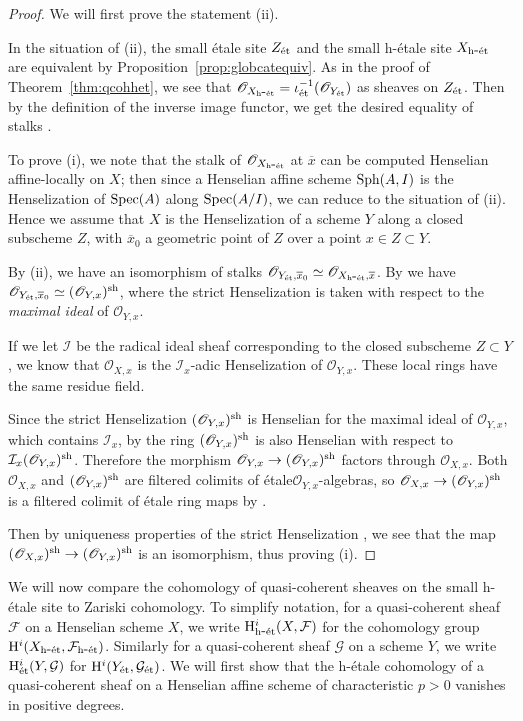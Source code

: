 \documentclass[12pt]{article}
\renewcommand{\O}{\mathscr{O}}
\newcommand{\F}{\mathcal{F}}
\newcommand{\G}{\mathcal{G}}
\newcommand{\spec}{{\rm Spec}}
\newcommand{\sph}{{\rm Sph}}
\newcommand{\ol}[1]{\overline{#1}}
\newcommand{\mc}[1]{\mathcal{#1}}
\newcommand{\Et}{\'etale\xspace}
\newcommand{\hetale}{h-\'etale\xspace}
\newcommand{\et}{{\rm\acute{e}t}}
\newcommand{\het}{{\rm h\mbox{-}\et}}
\renewcommand{\H}{{\rm H}}
\newcommand{\spcite}[2]{\cite[\href{https://stacks.math.columbia.edu/tag/#1}{{#2} {#1}}]{stackp}}
\theoremstyle{definition}
\numberwithin{equation}{subsection}
\begin{document}
\begin{proof}

We will first prove the statement (ii). 

In the situation of (ii), the small \Et site $Z_{\et}$ and the small \hetale site $X_{\het}$ are equivalent by Proposition~\ref{prop:globcatequiv}. As in the proof of Theorem~\ref{thm:qcohhet}, we see that  $\O_{X_{\het}}=\iota_{\et}^{-1}(\O_{Y_{\et}})$ as sheaves on $Z_{\et}$. Then by the definition of the inverse image functor, we get the desired equality of stalks \spcite{03Q1}{Lemma}.


To prove (i), we note that the stalk of $\O_{X_{\het}}$ at $\ol{x}$ can be computed Henselian affine-locally on $X$; then since a Henselian affine scheme $\sph(A,I)$ is the Henselization of $\spec(A)$ along $\spec(A/I)$, we can reduce to the situation of (ii). Hence we assume that $X$ is the Henselization of a scheme $Y$ along a closed subscheme $Z$, with $\ol{x}_0$ a geometric point of $Z$ over a point $x \in Z \subset Y$.

By (ii), we have an isomorphism of stalks $\O_{Y_{\et},\ol{x}_0} \simeq \O_{X_{\het},\ol{x}}$. By \spcite{04HX}{Lemma} we have $\O_{Y_{\et},\ol{x}_0} \simeq (\O_{Y,x})^{\rm sh}$, where the strict Henselization is taken with respect to the {\it maximal ideal} of $\O_{Y,x}$.

If we let $\mc{I}$ be the radical ideal sheaf corresponding to the closed subscheme $Z \subset Y$, we know that $\O_{X,x}$ is the $\mc{I}_x$-adic Henselization of $\O_{Y,x}$. These local rings have the same residue field.

Since the strict Henselization  $(\O_{Y,x})^{\rm sh}$ is Henselian for the maximal ideal of $\O_{Y,x}$, which contains $\mc{I}_x$, by \spcite{0DYD}{Lemma} the ring $(\O_{Y,x})^{\rm sh}$ is also Henselian with respect to $\mc{I}_x(\O_{Y,x})^{\rm sh}$. Therefore the morphism $\O_{Y,x} \to (\O_{Y,x})^{\rm sh}$ factors through $\O_{X,x}$. Both $\O_{X,x}$ and $(\O_{Y,x})^{\rm sh}$ are filtered colimits of \Et $\O_{Y,x}$-algebras, so $\O_{X,x} \to (\O_{Y,x})^{\rm sh}$ is a filtered colimit of \Et ring maps by \spcite{08HS}{Lemma}.
 
 Then by uniqueness properties of the strict Henselization \spcite{08HT}{Lemma}, we see that the map $(\O_{X,x})^{\rm sh} \to (\O_{Y,x})^{\rm sh}$ is an isomorphism, thus proving (i).\end{proof}

We will now compare the cohomology of quasi-coherent sheaves on the small \hetale site to Zariski cohomology. To simplify notation, for a quasi-coherent sheaf $\F$ on a Henselian scheme $X$, we write $\H^i_{\het}(X,\F)$ for the cohomology group $\H^i(X_{\het},\F_{\het})$. Similarly for a quasi-coherent sheaf $\G$ on a scheme $Y$, we write $\H^i_{\et}(Y,\G)$ for $\H^i(Y_{\et},\G_{\et})$. We will first show that the \hetale cohomology of a quasi-coherent sheaf on a Henselian affine scheme of characteristic $p > 0$ vanishes in positive degrees.
\end{document}

